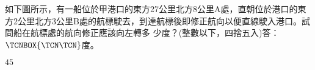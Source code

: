 \begin{QUESTIONS}
\begin{QUESTION}
        \begin{QBODY}
		如下圖所示，有一船位於甲港口的東方27公里北方8公里A處，直朝位於港口的東方2公里北方3公里B處的航標駛去，到達航標後即修正航向以便直線駛入港口。試問船在航標處的航向修正應該向左轉多
少度？(整數以下，四捨五入)答：$\TCNBOX{\TCN\TCN}$度。
        \end{QBODY}
        \begin{QFROMS}
        \end{QFROMS}
        \begin{QTAGS}\end{QTAGS}
        \begin{QANS}
		$45$
        \end{QANS}
        \begin{QSOLLIST}
        \end{QSOLLIST}
        \begin{QEMPTYSPACE}
        \end{QEMPTYSPACE}
    \end{QUESTION}
\end{QUESTIONS}